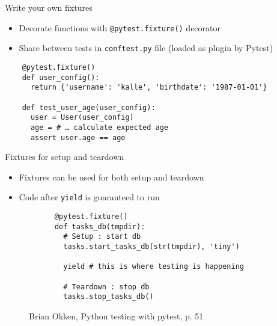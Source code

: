 \begin{frame}[fragile]{Write your own fixtures}
  \begin{itemize}
    \item Decorate functions with \texttt{@pytest.fixture()} decorator
    \item Share between tests in \texttt{conftest.py} file (loaded as plugin by Pytest)
  \end{itemize}

  \begin{verbatim}
    @pytest.fixture()
    def user_config():
      return {'username': 'kalle', 'birthdate': '1987-01-01'}

    def test_user_age(user_config):
      user = User(user_config)
      age = # … calculate expected age
      assert user.age == age
  \end{verbatim}

\end{frame}

\begin{frame}[fragile]{Fixtures for setup and teardown}
  \begin{itemize}
    \item Fixtures can be used for both setup and teardown
    \item Code after \texttt{yield} is guaranteed to run
  \end{itemize}

  \begin{figure}
    \begin{verbatim}
      @pytest.fixture()
      def tasks_db(tmpdir):
        # Setup : start db
        tasks.start_tasks_db(str(tmpdir), 'tiny')

        yield # this is where testing is happening

        # Teardown : stop db
        tasks.stop_tasks_db()
    \end{verbatim}
    \caption{Brian Okken, Python testing with pytest, p. 51}
  \end{figure}
\end{frame}
